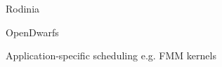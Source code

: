 \documentclass[../document.tex]{subfiles}
\begin{document}
\label{sec:related_work}

Rodinia

OpenDwarfs

Application-specific scheduling e.g. FMM kernels
\end{document}

